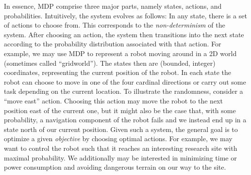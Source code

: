 \documentclass{article}
\begin{document}
In essence, MDP comprise three major parts, namely states, actions, and probabilities.
Intuitively, the system evolves as follows:
In any state, there is a set of actions to choose from.
This corresponds to the \emph{non-determinism} of the system.
After choosing an action, the system then transitions into the next state according to the probability distribution associated with that action.
For example, we may use MDP to represent a robot moving around in a 2D world (sometimes called \enquote{gridworld}).
The states then are (bounded, integer) coordinates, representing the current position of the robot.
In each state the robot can choose to move in one of the four cardinal directions or carry out some task depending on the current location.
To illustrate the randomness, consider a \enquote{move east} action.
Choosing this action may move the robot to the next position east of the current one, but it might also be the case that, with some probability, a navigation component of the robot fails and we instead end up in a state north of our current position.
Given such a system, the general goal is to optimize a given \emph{objective} by choosing optimal actions.
For example, we may want to control the robot such that it reaches an interesting research site with maximal probability.
We additionally may be interested in minimizing time or power consumption and avoiding dangerous terrain on our way to the site.
\end{document}
